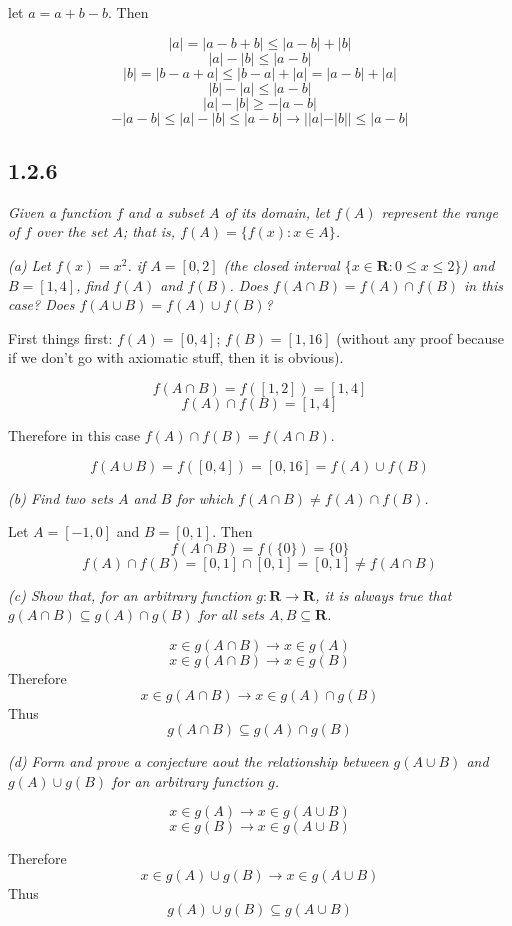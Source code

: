 \documentclass[11pt,oneside,titlepage]{book}
\begin{document}
let $a = a + b - b$. Then

$$|a| = |a - b + b| \leq |a - b| + |b|$$
$$|a| - |b| \leq |a - b|$$
$$|b| = |b - a + a| \leq |b - a| + |a| = |a - b| + |a|$$
$$|b| - |a| \leq |a - b|$$
$$|a| - |b| \geq -|a - b|$$
$$-|a - b| \leq |a| - |b| \leq |a - b| \to ||a| - |b|| \leq |a - b|$$

\subsection*{1.2.6}
\textit{Given a function $f$ and a subset $A$ of its domain, let $f(A)$
  represent the range of $f$ over the set $A$; that is,
  $f(A) = \{f(x): x \in A\}$. }

\textit{(a) Let $f(x) = x^2$. if $A=[0,2]$ (the closed interval $\{x \in
  \textbf{R}: 0 \leq x \leq 2\}$) and $B=[1,4]$, find $f(A)$ and $f(B)$. Does
  $f (A \cap B) = f(A) \cap f(B)$ in this case? Does $f(A \cup B) = f(A) \cup
  f(B)$? }

First things first: $f(A) = [0, 4]$; $f(B) = [1, 16]$ (without any proof
because if we don't go with axiomatic stuff, then it is obvious).

$$f(A \cap B) = f([1, 2]) = [1, 4]$$
$$f(A) \cap f(B) = [1, 4]$$

Therefore in this case $f(A) \cap f(B) = f(A \cap B)$.

$$f(A \cup B) = f([0, 4]) = [0, 16] = f(A) \cup f(B)$$

\textit{(b) Find two sets $A$ and $B$ for which $f(A \cap B) \neq f(A) \cap f(B)$.}

Let $A = [-1, 0]$ and $B = [0, 1]$. Then
$$f(A \cap B) = f(\{0\}) = \{0\}$$
$$f(A) \cap f(B) = [0, 1] \cap [0, 1] = [0, 1] \neq f(A \cap B)$$

\textit{(c) Show that, for an arbitrary function $g: \textbf{R} \to \textbf{R}$, it
  is always true that $g(A \cap B) \subseteq g(A) \cap g(B)$ for all sets
  $A,B \subseteq \textbf{R}$.}

$$x \in g(A \cap B) \to x \in g(A)$$
$$x \in g(A \cap B) \to x \in g(B)$$
Therefore
$$x \in g(A \cap B) \to x \in g(A) \cap g(B)$$
Thus
$$g(A \cap B) \subseteq g(A) \cap g(B)$$

\textit{(d) Form and prove a conjecture aout the relationship between
  $g(A \cup B)$ and $g(A) \cup g(B)$ for an arbitrary function $g$.}

$$x \in g(A) \to x \in g(A \cup B)$$
$$x \in g(B) \to x \in g(A \cup B)$$

Therefore
$$x \in g(A) \cup g(B) \to x \in g(A \cup B)$$
Thus
$$g(A) \cup g(B) \subseteq g(A \cup B)$$
\end{document}
